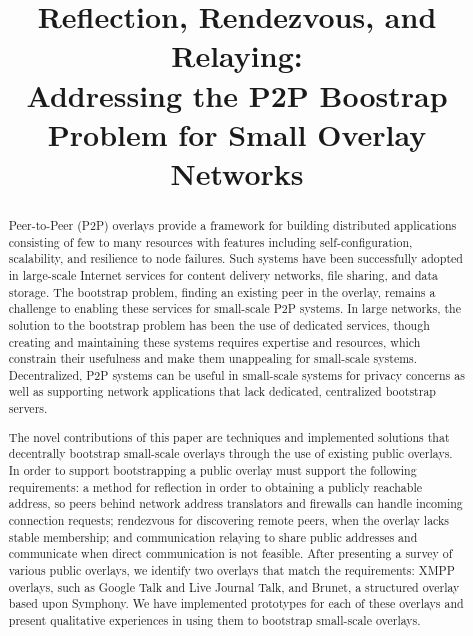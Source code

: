 \documentclass[conference]{IEEEtran}
\begin{document}
\title{Reflection, Rendezvous, and Relaying: \\
Addressing the P2P Boostrap Problem for Small Overlay Networks}

\author{
}

\maketitle

\begin{abstract}

Peer-to-Peer (P2P) overlays provide a framework for building distributed
applications consisting of few to many resources with features including
self-configuration, scalability, and resilience to node failures.  Such systems
have been successfully adopted in large-scale Internet services for content
delivery networks, file sharing, and data storage.  The bootstrap problem,
finding an existing peer in the overlay, remains a challenge to enabling these
services for small-scale P2P systems.  In large networks, the solution to the
bootstrap problem has been the use of dedicated services, though creating and
maintaining these systems requires expertise and resources, which constrain
their usefulness and make them unappealing for small-scale systems.
Decentralized, P2P systems can be useful in small-scale systems for privacy
concerns as well as supporting network applications that lack dedicated,
centralized bootstrap servers.

The novel contributions of this paper are techniques and implemented solutions
that decentrally bootstrap small-scale overlays through the use of existing
public overlays.  In order to support bootstrapping a public overlay must
support the following requirements: a method for reflection in order to
obtaining a publicly reachable address, so peers behind network address
translators and firewalls can handle incoming connection requests; rendezvous
for discovering remote peers, when the overlay lacks stable membership; and
communication relaying to share public addresses and communicate when direct
communication is not feasible.  After presenting a survey of various public
overlays, we identify two overlays that match the requirements:  XMPP overlays,
such as Google Talk and Live Journal Talk, and Brunet, a structured overlay
based upon Symphony.  We have implemented prototypes for each of these overlays
and present qualitative experiences in using them to bootstrap small-scale
overlays.

\end{abstract}
\end{document}
